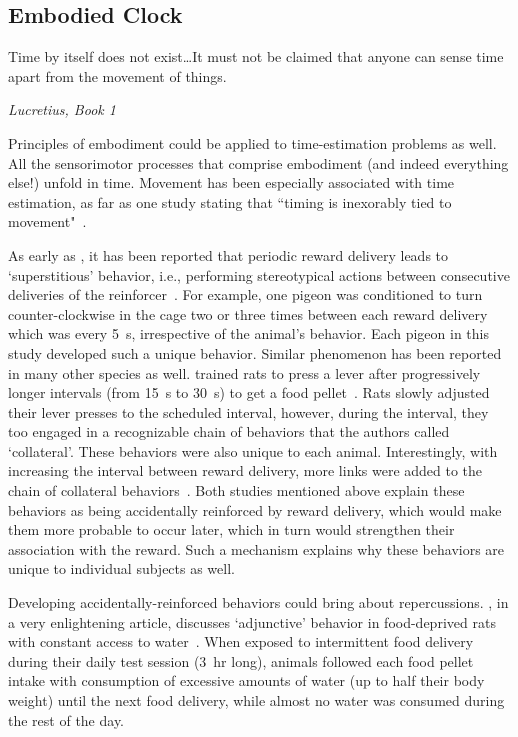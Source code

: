 \subsection{Embodied Clock}
\label{ch:intro:Embodiment:Embodied Clock}
\epigraph{Time by itself does not exist\ldots It must not be claimed that anyone can sense time apart from the movement of things.}
{\textit{Lucretius, Book 1}}
\noindent
Principles of embodiment could be applied to time-estimation problems as well.
All the sensorimotor processes that comprise embodiment (and indeed everything else!) unfold in time.
Movement has been especially associated with time estimation, as far as one study stating that ``timing is inexorably tied to movement"~\cite{Wiener2019eNeuro}.
\par
As early as \citeyear{Skinner1948}, it has been reported that periodic reward delivery leads to `superstitious' behavior, i.e., performing stereotypical actions between consecutive deliveries of the reinforcer~\cite{Skinner1948}.
For example, one pigeon was conditioned to turn counter-clockwise in the cage two or three times between each reward delivery which was every 5~s, irrespective of the animal's behavior.
Each pigeon in this study developed such a unique behavior.
Similar phenomenon has been reported in many other species as well.
 trained rats to press a lever after progressively longer intervals (from 15~s to 30~s) to get a food pellet~\cite{Wilson1953}.
Rats slowly adjusted their lever presses to the scheduled interval, however, during the interval, they too engaged in a recognizable chain of behaviors that the authors called `collateral'.
These behaviors were also unique to each animal.
Interestingly, with increasing the interval between reward delivery, more links were added to the chain of collateral behaviors~\cite{Wilson1953}.
Both studies mentioned above explain these behaviors as being accidentally reinforced by reward delivery, which would make them more probable to occur later, which in turn would strengthen their association with the reward.
Such a mechanism explains why these behaviors are unique to individual subjects as well.
\par
Developing accidentally-reinforced behaviors could bring about repercussions.
, in a very enlightening article, discusses `adjunctive' behavior in food-deprived rats with constant access to water~\cite{Falk1971}.
When exposed to intermittent food delivery during their daily test session (3~hr long), animals followed each food pellet intake with consumption of excessive amounts of water (up to half their body weight) until the next food delivery, while almost no water was consumed during the rest of the day.
